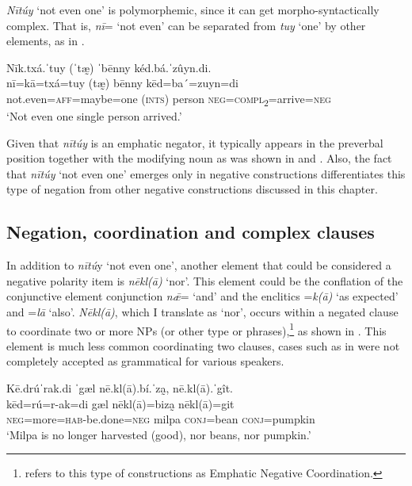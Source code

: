 \documentclass[output=paper,colorlinks=true, citecolor=brown]{langscibook}
\begin{document}
\textit{Nītúy} ‘not even one’ is polymorphemic, since it can get morpho-syntactically complex. That is, \textit{nī}= ‘not even’ can be separated from \textit{tuy} ‘one’ by other elements, as in .

\ea\label{ex:zap:90} 
    \glll Nīk.txá.ˈtuy (ˈtæ̰) ˈbēnny kéd.bá.ˈzûyn.di.\\ 
           nī=kā=txá=tuy (tæ̰) bēnny kēd=ba´=zuyn=di\\
           not.even=\textsc{aff}=maybe=one (\textsc{ints}) person \textsc{neg}=\textsc{compl}\textsc{\textsubscript{2}}=arrive=\textsc{neg}\\
    \glt  ‘Not even one single person arrived.’
\z 

Given that \textit{nītúy} is an emphatic negator, it typically appears in the preverbal position together with the modifying noun as was shown in  and . Also, the fact that \textit{nītúy} ‘not even one’ emerges only in negative constructions differentiates this type of negation from other negative constructions discussed in this chapter.

\subsection{Negation, coordination and complex clauses}\label{sec:zap:4.5}

In addition to \textit{nītú}y ‘not even one’, another element that could be considered a negative polarity item is \textit{nēkl(ā)} ‘nor’. This element could be the conflation of the conjunctive element conjunction \textit{nǣ}= ‘and’ and the enclitics =\textit{k(ā)} ‘as expected’ and =\textit{lā} ‘also’. \textit{Nēkl(ā)}, which I translate as ‘nor’, occurs within a negated clause to coordinate two or more NPs (or other type or phrases),\footnote{\citet{Salaberri2022} refers to this type of constructions as Emphatic Negative Coordination.} as shown in . This element is much less common coordinating two clauses, cases such as in  were not completely accepted as grammatical for various speakers.

\ea\label{ex:zap:91} 
    \glll Kē.drúˈrak.di ˈgæl nē.kl(ā).bí.ˈza̰, nē.kl(ā).ˈgît.\\ 
           kēd=rú=r-ak=di gæl nēkl(ā)=biza̰ nēkl(ā)=git\\
          \textsc{neg}=more=\textsc{hab}{}-be.done=\textsc{neg} milpa \textsc{conj}=bean \textsc{conj}=pumpkin\\
    \glt  ‘Milpa is no longer harvested (good), nor beans, nor pumpkin.’
\z
\end{document}

